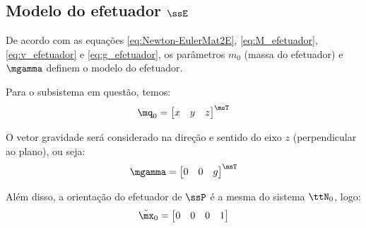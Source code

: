 \documentclass[]{politex}
\begin{document}
\subsection{Modelo do efetuador $\ssE$}

De acordo com as equações \eqref{eq:Newton-EulerMat2E}, \eqref{eq:M_efetuador}, \eqref{eq:v_efetuador} e \eqref{eq:g_efetuador}, os parâmetros $m_0$ (massa do efetuador) e $\mgamma$ definem o modelo do efetuador.

Para o subsistema em questão, temos:
\begin{equation}
\mq_0 = \begin{bmatrix}
x & y & z
\end{bmatrix}^\msT
\end{equation}

O vetor gravidade será considerado na direção e sentido do eixo $z$ (perpendicular ao plano), ou seja:
\begin{equation}
\mgamma = \begin{bmatrix}
0 & 0 & g
\end{bmatrix}^\msT
\end{equation}

Além disso, a orientação do efetuador de $\ssP$ é a mesma do sistema $\ttN_0$, logo:
\begin{equation}
\breve{\mx}_0 = \begin{bmatrix} 0 & 0 & 0 & 1 \end{bmatrix}
\end{equation}

\end{document}
